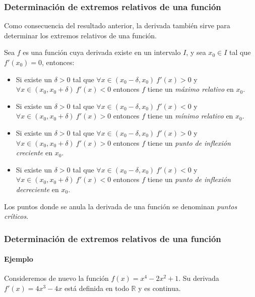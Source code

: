 \begin{frame}
	\frametitle{Determinación de extremos relativos de una función}
	Como consecuencia del resultado anterior, la derivada también sirve para determinar los extremos relativos de una función.
	\begin{teorema}
		Sea $f$ es una función cuya derivada existe en un intervalo $I$, y sea $x_0\in I$ tal que $f'(x_0)=0$, entonces:
		\begin{itemize}
			\item Si existe un $\delta>0$ tal que $\forall x\in(x_0-\delta,x_0)\ f'(x)>0$ y $\forall x\in(x_0,x_0+\delta)\ f'(x)<0$ entonces $f$ tiene un \emph{máximo relativo} en $x_0$.
			\item Si existe un $\delta>0$ tal que $\forall x\in(x_0-\delta,x_0)\ f'(x)<0$ y $\forall x\in(x_0,x_0+\delta)\ f'(x)>0$ entonces $f$ tiene un \emph{mínimo relativo} en $x_0$.
			\item Si existe un $\delta>0$ tal que $\forall x\in(x_0-\delta,x_0)\ f'(x)>0$ y $\forall x\in(x_0,x_0+\delta)\ f'(x)>0$ entonces $f$ tiene un \emph{punto de inflexión creciente} en $x_0$.
			\item Si existe un $\delta>0$ tal que $\forall x\in(x_0-\delta,x_0)\ f'(x)<0$ y $\forall x\in(x_0,x_0+\delta)\ f'(x)<0$ entonces $f$ tiene un \emph{punto de inflexión decreciente} en $x_0$.
		\end{itemize}
	\end{teorema}
	Los puntos donde se anula la derivada de una función se denominan \emph{puntos críticos}.
	
	
\end{frame}


\begin{frame}
	\frametitle{Determinación de extremos relativos de una función}
	\framesubtitle{Ejemplo}
	Consideremos de nuevo la función $f(x)=x^4-2x^2+1$.
	Su derivada $f'(x)=4x^3-4x$ está definida en todo $\mathbb{R}$ y es continua.
	\begin{center}
		\scalebox{1}{}
	\end{center}
\end{frame}


